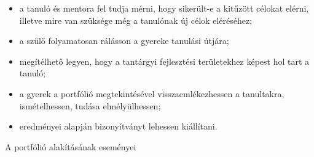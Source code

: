 \begin{itemize}
  \item a tanuló és mentora fel tudja mérni, hogy sikerült-e a kitűzött célokat
        elérni, illetve mire van szüksége még a tanulónak új célok eléréséhez;

  \item a szülő folyamatosan rálásson a gyereke tanulási útjára;

  \item megítélhető legyen, hogy a tantárgyi fejlesztési területekhez képest hol
        tart a tanuló;

  \item a gyerek a portfólió megtekintésével visszaemlékezhessen a tanultakra,
        ismételhessen, tudása elmélyülhessen;

  \item eredményei alapján bizonyítványt lehessen kiállítani.

\end{itemize}
A portfólió alakításának eseményei
